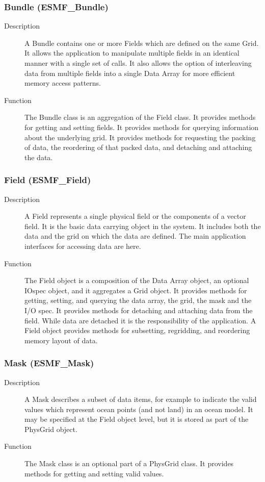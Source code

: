\subsubsection{Bundle (ESMF\_Bundle)}
\label{sec:bundle} 
\begin{description}
\item [Description] A Bundle contains one or more Fields which are defined on 
the same Grid.  It allows the application to manipulate multiple fields in 
an identical manner with a single set of calls.  It also allows the option 
of interleaving data from multiple fields into a single Data Array for 
more efficient memory access patterns.  
\item [Function] The Bundle class is an aggregation of the Field class.  
It provides methods for getting and setting fields.  It provides methods 
for querying information about the
underlying grid.  It provides methods for requesting the packing of data, the
reordering of that packed data, and detaching and attaching the data.
\end{description}


\subsubsection{Field (ESMF\_Field)}
\label{sec:field} 
\begin{description} 
\item [Description] A Field represents a single physical field or the components of a 
vector field.  It is the basic data carrying object in the system.  It includes both
the data and the grid on which the data are defined.  The main application interfaces
for accessing data are here.
\item [Function] The Field object is a composition of the Data Array object,
an optional IOspec object, and it aggregates a Grid object.  It provides
methods for getting, setting, and querying the data array, the grid, the mask and
the I/O spec.  It provides methods for detaching and attaching data from the field.
While data are detached it is the responsibility of the application.  A Field object
provides methods for subsetting, regridding, and reordering memory layout of data.
\end{description}

\subsubsection{Mask (ESMF\_Mask)}
\label{sec:mask} 
\begin{description}
\item [Description] A Mask describes a subset of data items, for example to indicate
the valid values which represent ocean points (and not land) in an ocean model.  
It may be specified at the Field object level, but it is stored as part of the PhysGrid object.
\item [Function] The Mask class is an optional part of a PhysGrid class.  
It provides methods for getting and setting valid values.
\end{description}

